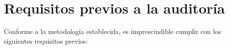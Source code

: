 \documentclass[a4paper, 11pt]{article}
\begin{document}
\clearpage



















\section{Requisitos previos a la auditoría}
\par\vspace{0.5cm}
Conforme a la metodología establecida, es imprescindible cumplir con los siguientes requisitos previos:
\end{document}
